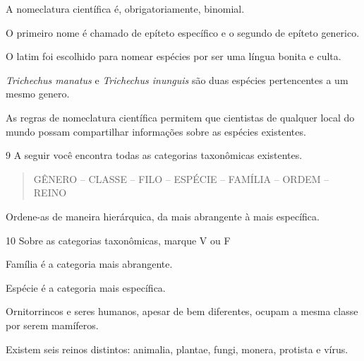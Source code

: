 {{\begin{boxlist}
\item A nomeclatura científica é, obrigatoriamente, binomial. 

\item O primeiro nome é chamado de epíteto específico e o segundo de
epíteto generico. 

\item O latim foi escolhido para nomear espécies por ser uma língua bonita
e culta. 

\item \emph{Trichechus manatus} e \emph{Trichechus inunguis} são duas
espécies pertencentes a um mesmo genero. 

\item As regras de nomeclatura científica permitem que cientistas de
qualquer local do mundo possam compartilhar informações sobre as
espécies existentes. 
\end{boxlist}

\num{9}  A seguir você encontra todas as categorias taxonômicas existentes.

\begin{quote}
GÊNERO -- CLASSE -- FILO -- ESPÉCIE -- FAMÍLIA -- ORDEM -- REINO
\end{quote}

Ordene-as de maneira hierárquica, da mais abrangente à mais específica.



\num{10}  Sobre as categorias taxonômicas, marque V ou F

\begin{boxlist}
\item Família é a categoria mais abrangente. 

\item Espécie é a categoria mais específica. 

\item Ornitorrincos e seres humanos, apesar de bem diferentes, ocupam a
mesma classe por serem mamíferos. 

\item Existem seis reinos distintos: animalia, plantae, fungi, monera,
protista e vírus. 
\end{boxlist}

}}
